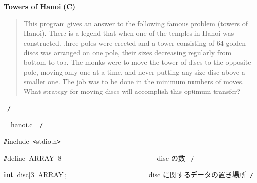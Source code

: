 \documentclass[a4paper,10pt]{article}
\def\mc{\relax}
\begin{document}
\tt\mc 

\noindent
\mbox{}\rm\mc {\tt /}{\tt *}\  \hrulefill *
\tt\mc 

\noindent
\mbox{}\hfill

\noindent
\mbox{}\rm\mc \ %

\centerline{\bf Towers of Hanoi (C)}

\begin{quote}

This program gives an answer to the following famous problem (towers of
Hanoi).
There is a legend that when one of the temples in Hanoi was constructed,
three poles were erected and a tower consisting of 64 golden discs was
arranged on one pole, their sizes decreasing regularly from bottom to top.
The monks were to move the tower of discs to the opposite pole, moving
only one at a time, and never putting any size disc above a smaller one.
The job was to be done in the minimum numbers of moves. What strategy for
moving discs will accomplish this optimum transfer?
\end{quote}

\tt\mc 

\noindent
\mbox{}\hfill

\noindent
\mbox{}\rm\mc {\tt *} \hrulefill \rm\mc \ {\tt *}{\tt /}
\tt\mc 

\noindent
\mbox{}\hfill

\noindent
\mbox{}\rm\mc {\tt /}{\tt *}\  \hrulefill\ hanoi.c\ \hrulefill \rm\mc \ {\tt *}{\tt /}
\tt\mc 

\noindent
\mbox{}\hfill

\noindent
\mbox{}{\tt\#}include{\tt\mc \ }{\tt <}stdio.h{\tt >}

\noindent
\mbox{}\hfill

\noindent
\mbox{}{\tt\#}define{\tt\mc \ }ARRAY{\tt\mc \ }8{\tt\mc \ }{\tt\mc \ }{\tt\mc \ }{\tt\mc \ }{\tt\mc \ }{\tt\mc \ }{\tt\mc \ }{\tt\mc \ }{\tt\mc \ }{\tt\mc \ }{\tt\mc \ }{\tt\mc \ }{\tt\mc \ }{\tt\mc \ }{\tt\mc \ }{\tt\mc \ }{\tt\mc \ }{\tt\mc \ }{\tt\mc \ }{\tt\mc \ }{\tt\mc \ }{\tt\mc \ }{\tt\mc \ }{\tt\mc \ }{\tt\mc \ }\rm\mc {\tt /}{\tt *}\  \ disc の数 \hfill \rm\mc \ {\tt *}{\tt /}
\tt\mc 

\noindent
\mbox{}\hfill

\noindent
\mbox{}\textbf{int}{\tt\mc \ }disc[3][ARRAY];{\tt\mc \ }{\tt\mc \ }{\tt\mc \ }{\tt\mc \ }{\tt\mc \ }{\tt\mc \ }{\tt\mc \ }{\tt\mc \ }{\tt\mc \ }{\tt\mc \ }{\tt\mc \ }{\tt\mc \ }{\tt\mc \ }{\tt\mc \ }{\tt\mc \ }{\tt\mc \ }{\tt\mc \ }{\tt\mc \ }{\tt\mc \ }{\tt\mc \ }{\tt\mc \ }\rm\mc {\tt /}{\tt *}\  \ disc に関するデータの置き場所\hfill \rm\mc \ {\tt *}{\tt /}
\tt\mc 
\end{document}
